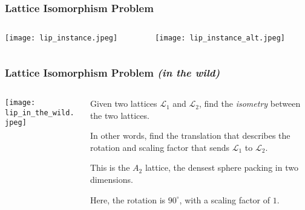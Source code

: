 \documentclass[
aspectratio=169, %
t, %
onlytextwidth, %
10pt, %
]{beamer}
\begin{document}

\begin{frame}
    \frametitle{Lattice Isomorphism Problem}
    \begin{columns}[T] %
        \begin{column}{0.48\linewidth} %
            \texttt{[image: lip\_instance.jpeg]} %
        \end{column}
        \begin{column}{0.48\linewidth} %
            \texttt{[image: lip\_instance\_alt.jpeg]} %
        \end{column}
    \end{columns}
\end{frame}


\begin{frame}
    \frametitle{Lattice Isomorphism Problem \textit{(in the wild)}}
    \begin{columns}[T] %
        \begin{column}{0.48\linewidth} %
            \texttt{[image: lip\_in\_the\_wild.jpeg]} %
        \end{column}
        \begin{column}{0.48\linewidth}
            \begin{tcolorbox}[colback=ICLBlue!5!white,colframe=ICLBlue,title=Lattice Isomorphism Problem (LIP)]
                Given two lattices $\mathcal{L}_1$ and $\mathcal{L}_2$, find the \textit{isometry} between the two lattices.

                In other words, find the translation that describes the rotation and scaling factor that sends $\mathcal{L}_1$ to $\mathcal{L}_2$.
            \end{tcolorbox}
            This is the $A_2$ lattice, the densest sphere packing in two dimensions.

            Here, the rotation is $90^\circ$, with a scaling factor of $1$.
        \end{column}
    \end{columns}
\end{frame}
\end{document}
